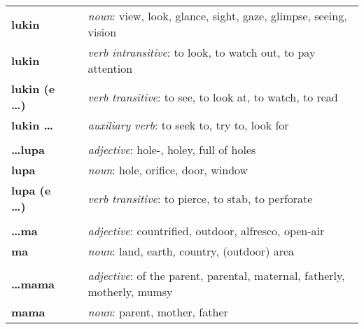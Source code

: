 \begin{supertabular}{p{2,5cm}|ll}
    \textbf{lukin}               &  & \textit{noun}: view, look, glance, sight, gaze, glimpse, seeing, vision                                    \\
    \textbf{lukin}               &  & \textit{verb intransitive}: to look, to watch out, to pay attention                                        \\
    \textbf{lukin (e \dots)}     &  & \textit{verb transitive}: to see, to look at, to watch, to read                                            \\
    \textbf{lukin \dots}         &  & \textit{auxiliary verb}: to seek to, try to, look for                                                      \\
                                 &  &                                                                                                            \\
    \textbf{\dots lupa}          &  & \textit{adjective}: hole-, holey, full of holes                                                            \\
    \textbf{lupa}                &  & \textit{noun}: hole, orifice, door, window                                                                 \\
    \textbf{lupa (e \dots)}      &  & \textit{verb transitive}: to pierce, to stab, to perforate                                                 \\
                                 &  &                                                                                                            \\
    \textbf{\dots ma}            &  & \textit{adjective}: countrified, outdoor, alfresco, open-air                                               \\
    \textbf{ma}                  &  & \textit{noun}: land, earth, country, (outdoor) area                                                        \\
                                 &  &                                                                                                            \\
    \textbf{\dots mama}          &  & \textit{adjective}: of the parent, parental, maternal, fatherly, motherly, mumsy                           \\
    \textbf{mama}                &  & \textit{noun}: parent, mother, father                                                                      \\

\end{supertabular}

